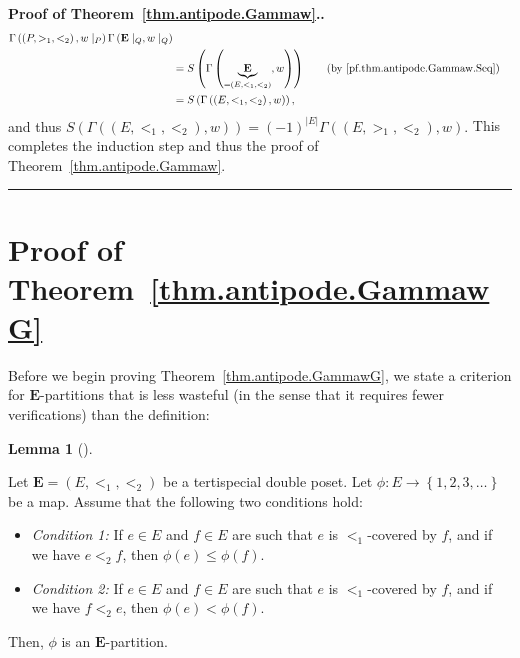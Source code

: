 \documentclass[numbers=enddot,12pt,final,onecolumn,notitlepage,abstracton]{scrartcl}
\theoremstyle{definition}
\newtheorem{lem}[theo]{Lemma}
\newenvironment{lemma}[1][]
{\begin{lem}[#1]\begin{leftbar}}
{\end{leftbar}\end{lem}}
\newenvironment{proof}[1][Proof]{\noindent\textbf{#1.} }{\ \rule{0.5em}{0.5em}}
\newenvironment{verlong}{}{}
\newcommand{\EE}{{\mathbf{E}}}
\begin{document}
\begin{proof}[Proof of Theorem~\ref{thm.antipode.Gammaw}.]
\begin{verlong}
\begin{align*}
\Gamma\left(\left(P, >_1, <_2\right), w\mid_P\right)
\Gamma\left(\EE\mid_Q, w\mid_Q\right) \\
&= S\left(\Gamma\left(\underbrace{\EE}_{=\left(E, <_1, <_2\right)}, w\right)\right)
\qquad \left(\text{by \eqref{pf.thm.antipode.Gammaw.Seq}}\right) \\
&= S\left(\Gamma\left(\left(E, <_1, <_2\right), w\right)\right) ,
\end{align*}
and thus
$S\left(\Gamma\left(\left(E, <_1, <_2\right), w\right)\right)
= \left(-1\right)^{\left|E\right|}
\Gamma\left(\left(E, >_1, <_2\right), w\right)$.
\end{verlong}
This completes the
induction step and thus the proof of Theorem~\ref{thm.antipode.Gammaw}.
\end{proof}

\section{Proof of Theorem~\ref{thm.antipode.GammawG}}
\label{sect.proofG}

Before we begin proving Theorem~\ref{thm.antipode.GammawG}, we state a
criterion for $\EE$-partitions that is less wasteful (in the sense that
it requires fewer verifications) than the definition:

\begin{lemma}
\label{lem.Epartition.cover}
Let $\EE = \left(E, <_1, <_2\right)$ be a tertispecial double poset.
Let $\phi : E \to \left\{1, 2, 3, \ldots\right\}$ be a map. Assume
that the following two conditions hold:

\begin{itemize}

\item \textit{Condition 1:} If $e \in E$ and $f \in E$ are such that
$e$ is $<_1$-covered by $f$, and if we have $e <_2 f$, then
$\phi\left(e\right) \leq \phi\left(f\right)$.

\item \textit{Condition 2:} If $e \in E$ and $f \in E$ are such that
$e$ is $<_1$-covered by $f$, and if we have $f <_2 e$, then
$\phi\left(e\right) < \phi\left(f\right)$.

\end{itemize}

Then, $\phi$ is an $\EE$-partition.
\end{lemma}
\end{document}
